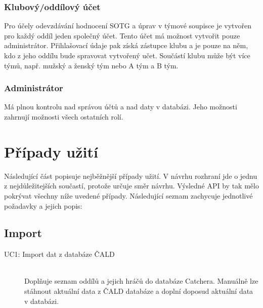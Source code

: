 \subsubsection*{Klubový/oddílový účet}

Pro účely odevzdávání hodnocení SOTG a úprav v týmové soupisce je vytvořen pro každý oddíl
jeden společný účet. Tento účet má možnost vytvořit pouze administrátor. Přihlašovací údaje pak
získá zástupce klubu a je pouze na něm, kdo z jeho oddílu bude spravovat vytvořený učet.
Součástí klubu může být více týmů, např. mužský a ženský tým nebo A tým a B tým.
  
\subsubsection*{Administrátor}
Má plnou kontrolu nad správou účtů a nad daty v databázi. Jeho možnosti zahrnují možnosti
všech ostatních rolí.

\section{Případy užití}

Následující část popisuje nejběžnější případy užití. V návrhu rozhraní jde
o jednu z nejdůležitejších součastí, protože určuje směr návrhu. Výsledné API by tak mělo
pokrývat všechny níže uvedené případy. Následující seznam zachycuje jednotlivé požadavky
a jejich popis:


\subsection*{Import}
  \begin{description}
    \item[UC1: Import dat z databáze ČALD] \hfill \\
    Doplňuje seznam oddílů a jejich hráčů do databáze Catchera. Manuálně lze stáhnout
    aktuální data z ČALD databáze a doplní doposud aktuální data v databázi.
  \end{description}

